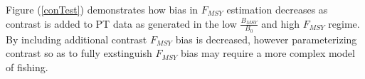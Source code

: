 \documentclass[12pt]{article}
\begin{document}
%
Figure (\ref{conTest}) demonstrates how bias in $F_{MSY}$ estimation %
decreases as contrast is added to PT data as generated in the low $\frac{B_{MSY}}{B_0}$ and 
high $F_{MSY}$ regime. By including additional contrast $F_{MSY}$ bias is decreased, however
parameterizing contrast so as to fully exstinguish $F_{MSY}$ bias may require a more complex 
model of fishing.

%
%
%
%
%
%
\end{document}
